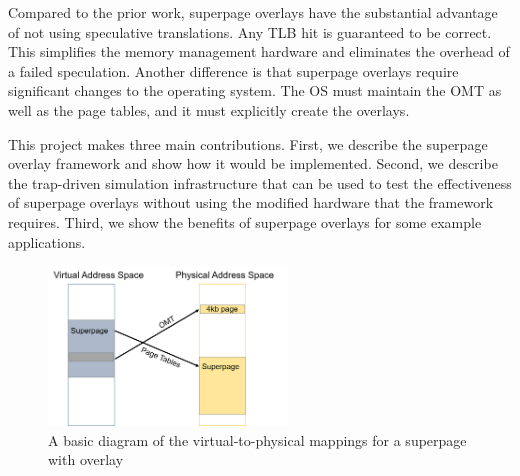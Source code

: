 Compared to the prior work, superpage overlays have the substantial advantage of not using speculative translations. Any TLB hit is guaranteed to be correct. This simplifies the memory management hardware and eliminates the overhead of a failed speculation. Another difference is that superpage overlays require significant changes to the operating system. The OS must maintain the OMT as well as the page tables, and it must explicitly create the overlays.

This project makes three main contributions. First, we describe the superpage overlay framework and show how it would be implemented. Second, we describe the trap-driven simulation infrastructure that can be used to test the effectiveness of superpage overlays without using the modified hardware that the framework requires. Third, we show the benefits of superpage overlays for some example applications.

\begin{figure}
    \centering
    \includegraphics[width=2.5in]{Figures/Picture1}
    \caption{A basic diagram of the virtual-to-physical mappings for a superpage with overlay}
    \label{fig:basic}
\end{figure}
